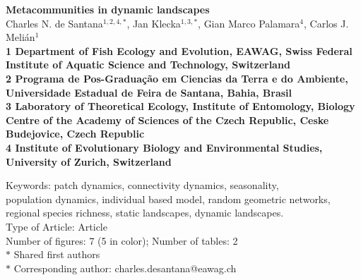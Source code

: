 \documentclass[12pt]{article}
\date{}
\begin{document}
\begin{flushleft}
{\Large
\textbf{Metacommunities in dynamic landscapes}
}
\\
\vspace{1.0cm} Charles N. de Santana$^{1,2,4,\ast}$, Jan
Klecka$^{1,3,\ast}$, Gian Marco Palamara$^{4}$, Carlos J. Meli\'an$^{1}$
\\
\vspace{1.0cm} \bf{1} Department of Fish Ecology and Evolution, EAWAG,
Swiss Federal Institute of Aquatic Science and Technology, Switzerland
\\
\bf{2} Programa de Pos-Graduaç\~{a}o em Ciencias da Terra e do Ambiente,
Universidade Estadual de Feira de Santana, Bahia, Brasil
\\
\bf{3} Laboratory of Theoretical Ecology, Institute of Entomology,
Biology Centre of the Academy of Sciences of the Czech Republic, Ceske
Budejovice, Czech Republic\\
\bf{4} Institute of Evolutionary Biology and Environmental Studies, University of Zurich, Switzerland\\
  \vspace{0.5 in}
  
  Keywords: patch dynamics, connectivity dynamics, seasonality,\\
  population dynamics, individual based model, random geometric networks,\\
  regional species richness, static landscapes, dynamic landscapes.\\
  Type of Article: Article\\
  Number of figures: 7 (5 in color); Number of tables: 2\\
$\ast$ Shared first authors\\
$\ast$ Corresponding author: charles.desantana@eawag.ch\\
\end{flushleft}

\newpage
\end{document}
